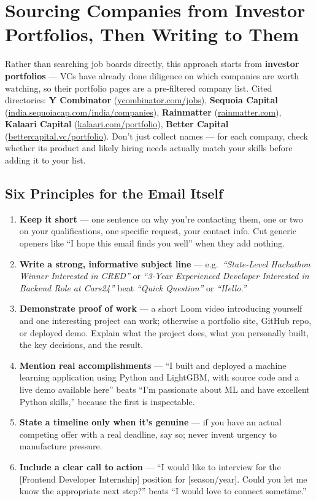 \section{Sourcing Companies from Investor Portfolios, Then Writing to Them}

Rather than searching job boards directly, this approach starts from \textbf{investor portfolios} — VCs have
already done diligence on which companies are worth watching, so their portfolio pages are a pre-filtered
company list. Cited directories: \textbf{Y Combinator} (\url{ycombinator.com/jobs}), \textbf{Sequoia Capital}
(\url{india.sequoiacap.com/india/companies}), \textbf{Rainmatter} (\url{rainmatter.com}), \textbf{Kalaari
Capital} (\url{kalaari.com/portfolio}), \textbf{Better Capital} (\url{bettercapital.vc/portfolio}). Don't just
collect names — for each company, check whether its product and likely hiring needs actually match your skills
before adding it to your list.

\subsection{Six Principles for the Email Itself}

\begin{enumerate}
  \item \textbf{Keep it short} — one sentence on why you're contacting them, one or two on your qualifications,
  one specific request, your contact info. Cut generic openers like ``I hope this email finds you well'' when
  they add nothing.
  \item \textbf{Write a strong, informative subject line} — e.g.\ \emph{``State-Level Hackathon Winner Interested
  in CRED''} or \emph{``3-Year Experienced Developer Interested in Backend Role at Cars24''} beat \emph{``Quick
  Question''} or \emph{``Hello.''}
  \item \textbf{Demonstrate proof of work} — a short Loom video introducing yourself and one interesting project
  can work; otherwise a portfolio site, GitHub repo, or deployed demo. Explain what the project does, what you
  personally built, the key decisions, and the result.
  \item \textbf{Mention real accomplishments} — ``I built and deployed a machine learning application using
  Python and LightGBM, with source code and a live demo available here'' beats ``I'm passionate about ML and
  have excellent Python skills,'' because the first is inspectable.
  \item \textbf{State a timeline only when it's genuine} — if you have an actual competing offer with a real
  deadline, say so; never invent urgency to manufacture pressure.
  \item \textbf{Include a clear call to action} — ``I would like to interview for the [Frontend Developer
  Internship] position for [season/year]. Could you let me know the appropriate next step?'' beats ``I would
  love to connect sometime.''
\end{enumerate}

